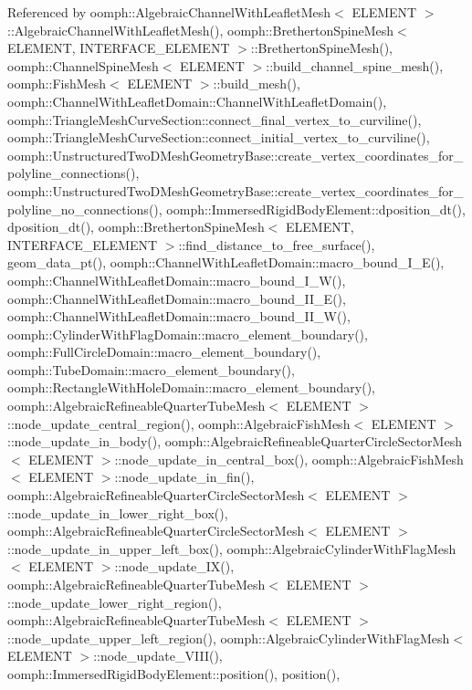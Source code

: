 Referenced by oomph\+::\+Algebraic\+Channel\+With\+Leaflet\+Mesh$<$ E\+L\+E\+M\+E\+N\+T $>$\+::\+Algebraic\+Channel\+With\+Leaflet\+Mesh(), oomph\+::\+Bretherton\+Spine\+Mesh$<$ E\+L\+E\+M\+E\+N\+T, I\+N\+T\+E\+R\+F\+A\+C\+E\+\_\+\+E\+L\+E\+M\+E\+N\+T $>$\+::\+Bretherton\+Spine\+Mesh(), oomph\+::\+Channel\+Spine\+Mesh$<$ E\+L\+E\+M\+E\+N\+T $>$\+::build\+\_\+channel\+\_\+spine\+\_\+mesh(), oomph\+::\+Fish\+Mesh$<$ E\+L\+E\+M\+E\+N\+T $>$\+::build\+\_\+mesh(), oomph\+::\+Channel\+With\+Leaflet\+Domain\+::\+Channel\+With\+Leaflet\+Domain(), oomph\+::\+Triangle\+Mesh\+Curve\+Section\+::connect\+\_\+final\+\_\+vertex\+\_\+to\+\_\+curviline(), oomph\+::\+Triangle\+Mesh\+Curve\+Section\+::connect\+\_\+initial\+\_\+vertex\+\_\+to\+\_\+curviline(), oomph\+::\+Unstructured\+Two\+D\+Mesh\+Geometry\+Base\+::create\+\_\+vertex\+\_\+coordinates\+\_\+for\+\_\+polyline\+\_\+connections(), oomph\+::\+Unstructured\+Two\+D\+Mesh\+Geometry\+Base\+::create\+\_\+vertex\+\_\+coordinates\+\_\+for\+\_\+polyline\+\_\+no\+\_\+connections(), oomph\+::\+Immersed\+Rigid\+Body\+Element\+::dposition\+\_\+dt(), dposition\+\_\+dt(), oomph\+::\+Bretherton\+Spine\+Mesh$<$ E\+L\+E\+M\+E\+N\+T, I\+N\+T\+E\+R\+F\+A\+C\+E\+\_\+\+E\+L\+E\+M\+E\+N\+T $>$\+::find\+\_\+distance\+\_\+to\+\_\+free\+\_\+surface(), geom\+\_\+data\+\_\+pt(), oomph\+::\+Channel\+With\+Leaflet\+Domain\+::macro\+\_\+bound\+\_\+\+I\+\_\+\+E(), oomph\+::\+Channel\+With\+Leaflet\+Domain\+::macro\+\_\+bound\+\_\+\+I\+\_\+\+W(), oomph\+::\+Channel\+With\+Leaflet\+Domain\+::macro\+\_\+bound\+\_\+\+I\+I\+\_\+\+E(), oomph\+::\+Channel\+With\+Leaflet\+Domain\+::macro\+\_\+bound\+\_\+\+I\+I\+\_\+\+W(), oomph\+::\+Cylinder\+With\+Flag\+Domain\+::macro\+\_\+element\+\_\+boundary(), oomph\+::\+Full\+Circle\+Domain\+::macro\+\_\+element\+\_\+boundary(), oomph\+::\+Tube\+Domain\+::macro\+\_\+element\+\_\+boundary(), oomph\+::\+Rectangle\+With\+Hole\+Domain\+::macro\+\_\+element\+\_\+boundary(), oomph\+::\+Algebraic\+Refineable\+Quarter\+Tube\+Mesh$<$ E\+L\+E\+M\+E\+N\+T $>$\+::node\+\_\+update\+\_\+central\+\_\+region(), oomph\+::\+Algebraic\+Fish\+Mesh$<$ E\+L\+E\+M\+E\+N\+T $>$\+::node\+\_\+update\+\_\+in\+\_\+body(), oomph\+::\+Algebraic\+Refineable\+Quarter\+Circle\+Sector\+Mesh$<$ E\+L\+E\+M\+E\+N\+T $>$\+::node\+\_\+update\+\_\+in\+\_\+central\+\_\+box(), oomph\+::\+Algebraic\+Fish\+Mesh$<$ E\+L\+E\+M\+E\+N\+T $>$\+::node\+\_\+update\+\_\+in\+\_\+fin(), oomph\+::\+Algebraic\+Refineable\+Quarter\+Circle\+Sector\+Mesh$<$ E\+L\+E\+M\+E\+N\+T $>$\+::node\+\_\+update\+\_\+in\+\_\+lower\+\_\+right\+\_\+box(), oomph\+::\+Algebraic\+Refineable\+Quarter\+Circle\+Sector\+Mesh$<$ E\+L\+E\+M\+E\+N\+T $>$\+::node\+\_\+update\+\_\+in\+\_\+upper\+\_\+left\+\_\+box(), oomph\+::\+Algebraic\+Cylinder\+With\+Flag\+Mesh$<$ E\+L\+E\+M\+E\+N\+T $>$\+::node\+\_\+update\+\_\+\+I\+X(), oomph\+::\+Algebraic\+Refineable\+Quarter\+Tube\+Mesh$<$ E\+L\+E\+M\+E\+N\+T $>$\+::node\+\_\+update\+\_\+lower\+\_\+right\+\_\+region(), oomph\+::\+Algebraic\+Refineable\+Quarter\+Tube\+Mesh$<$ E\+L\+E\+M\+E\+N\+T $>$\+::node\+\_\+update\+\_\+upper\+\_\+left\+\_\+region(), oomph\+::\+Algebraic\+Cylinder\+With\+Flag\+Mesh$<$ E\+L\+E\+M\+E\+N\+T $>$\+::node\+\_\+update\+\_\+\+V\+I\+I\+I(), oomph\+::\+Immersed\+Rigid\+Body\+Element\+::position(), position(), 